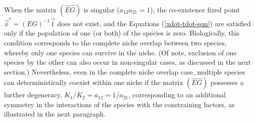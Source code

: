 When the matrix $(\hat{E}\hat{G})$ is singular ($a_{12}a_{21}=1$), the co-existence fixed point $\vec{x}^* = (E G)^{-1}\vec{1}$ does not exist, and the Equations (\ref{xdot-tdot-eqn}) are satisfied only if the population of one (or both) of the species is zero. %
Biologically, this condition corresponds to the complete niche overlap between two species, whereby only one species can survive in the niche. 
(Of note, exclusion of one species by the other can also occur in non-singular cases, as discussed in the next section.) 
Nevertheless, even in the complete niche overlap case, multiple species can deterministically coexist within one niche if the matrix $(\hat{E}\hat{G})$ possesses a further degeneracy, $K_1/K_2=a_{12}=1/a_{21}$, corresponding to an additional symmetry in the interactions of the species with the constraining factors, as illustrated in the next paragraph. %

